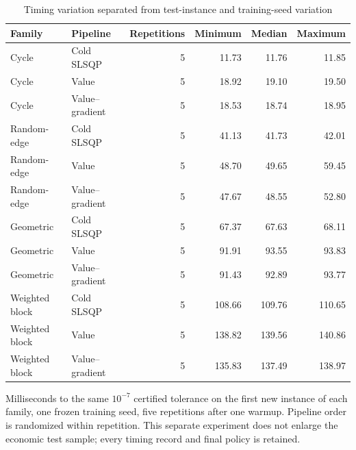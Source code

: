 \begin{table}[p]\centering
\caption{Timing variation separated from test-instance and training-seed variation}\label{tab:r12-repeated}
\setlength{\tabcolsep}{3.5pt}\begin{tabular}{llrrrr}
\toprule
Family & Pipeline & Repetitions & Minimum & Median & Maximum \\
\midrule
Cycle & Cold SLSQP & 5 & 11.73 & 11.76 & 11.85 \\
Cycle & Value & 5 & 18.92 & 19.10 & 19.50 \\
Cycle & Value--gradient & 5 & 18.53 & 18.74 & 18.95 \\
Random-edge & Cold SLSQP & 5 & 41.13 & 41.73 & 42.01 \\
Random-edge & Value & 5 & 48.70 & 49.65 & 59.45 \\
Random-edge & Value--gradient & 5 & 47.67 & 48.55 & 52.80 \\
Geometric & Cold SLSQP & 5 & 67.37 & 67.63 & 68.11 \\
Geometric & Value & 5 & 91.91 & 93.55 & 93.83 \\
Geometric & Value--gradient & 5 & 91.43 & 92.89 & 93.77 \\
Weighted block & Cold SLSQP & 5 & 108.66 & 109.76 & 110.65 \\
Weighted block & Value & 5 & 138.82 & 139.56 & 140.86 \\
Weighted block & Value--gradient & 5 & 135.83 & 137.49 & 138.97 \\
\bottomrule
\end{tabular}
\begin{minipage}{.98\textwidth}\small
Milliseconds to the same $10^{-7}$ certified tolerance on the first new instance of each family, one frozen training seed, five repetitions after one warmup. Pipeline order is randomized within repetition. This separate experiment does not enlarge the economic test sample; every timing record and final policy is retained.
\end{minipage}
\end{table}
